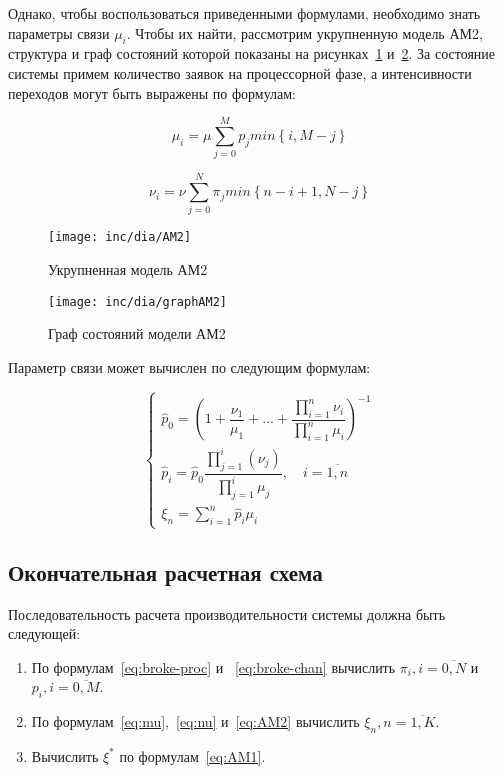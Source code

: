 Однако, чтобы воспользоваться приведенными формулами, необходимо знать параметры связи $\mu_i$. Чтобы их найти, рассмотрим укрупненную модель АМ2, структура и граф состояний которой показаны на рисунках~\ref{fig:AM2} и~\ref{fig:graphAM2}. За состояние системы примем количество заявок на процессорной фазе, а интенсивности переходов могут быть выражены по формулам:

\begin{equation}
\label{eq:mu}
\mu_i = \mu \sum \limits_{j=0}^M p_j min \left\lbrace i, M-j \right\rbrace
\end{equation}

\begin{equation}
\label{eq:nu}
\nu_i = \nu \sum \limits_{j=0}^N \pi_j min \left\lbrace n-i+1, N-j \right\rbrace
\end{equation}



\begin{figure}[ht]
\centering
\texttt{[image: inc/dia/AM2]}
\caption{Укрупненная модель АМ2}
\label{fig:AM2}
\end{figure}

\begin{figure}[ht]
\centering
\texttt{[image: inc/dia/graphAM2]}
\caption{Граф состояний модели АМ2}
\label{fig:graphAM2}
\end{figure}


Параметр связи может вычислен по следующим формулам:


\begin{equation}
\label{eq:AM2}
\left\{
   \begin{array}{lcl}
	\hat{p}_{0} = \left( 1 + \dfrac{\nu_1}{\mu_1} +  ... + \dfrac{\prod \limits_{i=1}^n \nu_i}{\prod \limits_{i=1}^n \mu_i} \right) ^{-1} \\
	\hat{p}_{i} = \hat{p}_{0} \dfrac{\prod \limits_{j=1}^{i} (\nu_j)}{\prod \limits_{j=1}^i \mu_{j}}, \quad i = \overline{1,n}  \\ 
	\xi_n = \sum \limits_{i=1}^n \hat{p}_i \mu_i
   \end{array}
\right.
\end{equation}


\subsection{Окончательная расчетная схема}
Последовательность расчета производительности системы должна быть следующей:

\begin{enumerate}
\item По формулам~\ref{eq:broke-proc} и ~\ref{eq:broke-chan} вычислить $\pi_i, i=\overline{0,N}$ и $p_i, i=\overline{0,M} $.
\item По формулам~\ref{eq:mu},~\ref{eq:nu} и~\ref{eq:AM2} вычислить $\xi_n, n=\overline{1,K}$.
\item Вычислить $\xi^{*}$ по формулам~\ref{eq:AM1}.
\end{enumerate}

